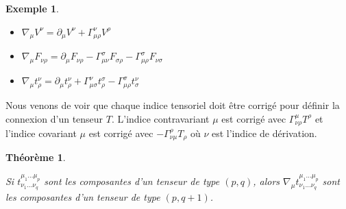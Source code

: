 \documentclass[a4paper,11pt]{report}
\theoremstyle{definition}
\theoremstyle{plain}
\newtheorem{thm}{Théorème}[chapter]
\theoremstyle{definition}
\newtheorem{exmp}{Exemple}[chapter]
\theoremstyle{remark}
\newcommand{\p}{\partial}
\begin{document}
                \begin{exmp}${}$
                    \begin{itemize}[label = \textbullet]
                        \item $\nabla_\mu V^\nu = \p_\mu V^\nu + \Gamma^\nu_{\mu\rho} V^\rho$
                        \item $\nabla_\mu F_{\nu\rho} = \p_\mu F_{\nu\rho}-\Gamma^\sigma_{\mu\nu}F_{\sigma\rho}-\Gamma^{\sigma}_{\mu\rho}F_{\nu\sigma}$
                        \item $\nabla_\mu t^\nu_\rho = \p_\mu t^\nu_\rho+\Gamma^\nu_{\mu\sigma}t^\sigma_\rho - \Gamma^\sigma_{\mu\rho}t^\nu_\sigma$
                    \end{itemize}
                    Nous venons de voir que chaque indice tensoriel doit être corrigé pour définir la connexion d'un tenseur $T$. L'indice contravariant $\mu$ est corrigé avec $\Gamma^\mu_{\nu\rho}T^\rho$ et l'indice covariant $\mu$ est corrigé avec $-\Gamma^\rho_{\nu\mu}T_\rho$ où $\nu$ est l'indice de dérivation.
                \end{exmp}
                
                \begin{thm}\begin{leftbar}
                    Si $t^{\mu_1\dots\mu_p}_{\nu_1\dots\nu_q}$ sont les composantes d'un tenseur de type $(p,q)$, alors $\nabla_\mu t^{\mu_1\dots\mu_p}_{\nu_1\dots\nu_q}$ sont les composantes d'un tenseur de type $(p,q+1)$.
                \end{leftbar}\end{thm}
                
\end{document}
